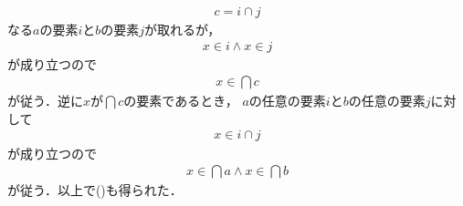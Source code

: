 \begin{description}
\begin{align}
				c = i \cap j
			\end{align}
			なる$a$の要素$i$と$b$の要素$j$が取れるが，
			\begin{align}
				x \in i \wedge x \in j
			\end{align}
			が成り立つので
			\begin{align}
				x \in \bigcap c
			\end{align}
			が従う．逆に$x$が$\bigcap c$の要素であるとき，
			$a$の任意の要素$i$と$b$の任意の要素$j$に対して
			\begin{align}
				x \in i \cap j
			\end{align}
			が成り立つので
			\begin{align}
				x \in \bigcap a \wedge x \in \bigcap b
			\end{align}
			が従う．以上で()も得られた．
			

\end{description}
